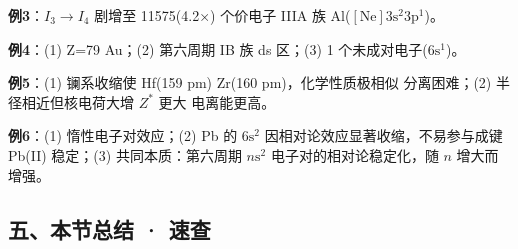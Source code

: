 \textbf{例3}：\(I_3 \to I_4\) 剧增至 11575(4.2×) 个价电子 \箭 IIIA 族 \箭 Al(\([\mathrm{Ne}]3\mathrm{s}^2 3\mathrm{p}^1\))。

\textbf{例4}：(1) Z=79 \箭 Au；(2) 第六周期 IB 族 ds 区；(3) 1 个未成对电子(\(6\mathrm{s}^1\))。

\textbf{例5}：(1) 镧系收缩使 Hf(159 pm)  Zr(160 pm)，化学性质极相似 \箭 分离困难；(2) 半径相近但核电荷大增 \箭 \(Z^*\) 更大 \箭 电离能更高。

\textbf{例6}：(1) 惰性电子对效应；(2) Pb 的 \(6\mathrm{s}^2\) 因相对论效应显著收缩，不易参与成键 \箭 Pb(II) 稳定；(3) 共同本质：第六周期 \(n\mathrm{s}^2\) 电子对的相对论稳定化，随 \(n\) 增大而增强。

\subsection{五、本节总结 · 速查}\label{ux4e94ux672cux8282ux603bux7ed3-ux901fux67e5}

